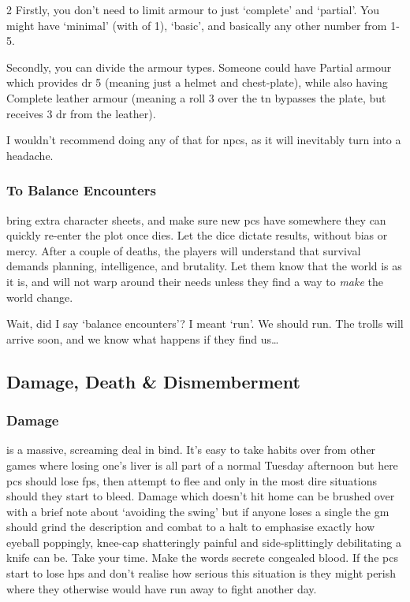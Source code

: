 \begin{multicols}{2}
Firstly, you don't need to limit armour to just `complete' and `partial'.
You might have `minimal' (with  of 1), `basic', and basically any other number from 1-5.

Secondly, you can divide the armour types.
Someone could have Partial armour which provides \gls{dr} 5 (meaning just a helmet and chest-plate), while also having Complete leather armour (meaning a roll 3 over the \gls{tn} bypasses the plate, but receives 3 \gls{dr} from the leather).

I wouldn't recommend doing any of that for \glspl{npc}, as it will inevitably turn into a headache.

\subsubsection{To Balance Encounters}
bring extra character sheets, and make sure new \glspl{pc} have somewhere they can quickly re-enter the plot once  dies.
Let the dice dictate results, without bias or mercy.
After a couple of deaths, the players will understand that survival demands planning, intelligence, and brutality.
Let them know that the world is as it is, and will not warp around their needs unless they find a way to \emph{make} the world change.

Wait, did I say `balance encounters'?
I meant `run'.
We should run.
The trolls will arrive soon, and we know what happens if they find us\ldots

\subsection{Damage, Death \& Dismemberment}

\subsubsection{Damage}
is a massive, screaming deal in \gls{bind}.
It's easy to take habits over from other games where losing one's liver is all part of a normal Tuesday afternoon but here \glspl{pc} should lose \glspl{fp}, then attempt to flee and only in the most dire situations should they start to bleed.
Damage which doesn't hit home can be brushed over with a brief note about `avoiding the swing' but if anyone loses a single  the \gls{gm} should grind the description and combat to a halt to emphasise exactly how eyeball poppingly, knee-cap shatteringly painful and side-splittingly debilitating a knife can be.
Take your time.
Make the words secrete congealed blood.
If the \glspl{pc} start to lose \glspl{hp} and don't realise how serious this situation is they might perish where they otherwise would have run away to fight another day.


\end{multicols}
